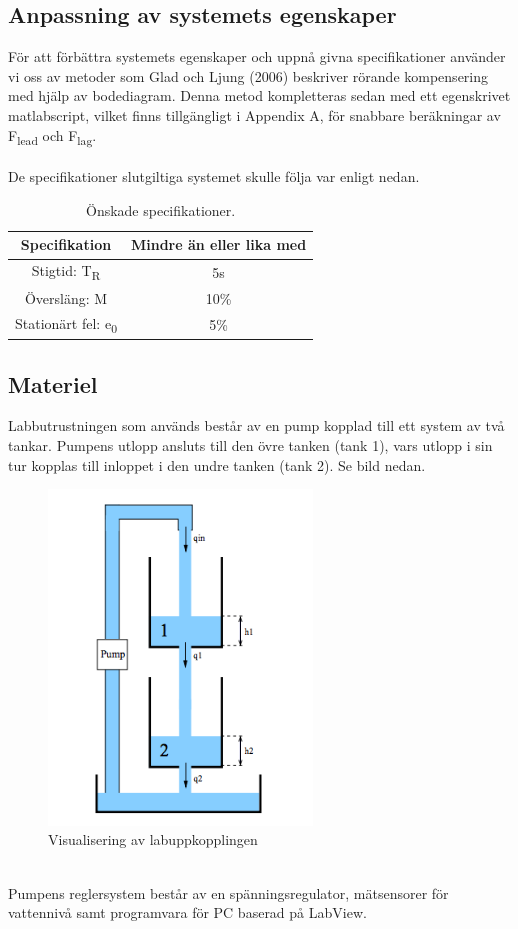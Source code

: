 \documentclass[a4wide]{article}
\begin{document}
\subsection{Anpassning av systemets egenskaper}
För att förbättra systemets egenskaper och uppnå givna specifikationer använder vi oss av metoder som Glad och Ljung (2006) beskriver rörande kompensering med hjälp av bodediagram. Denna metod kompletteras sedan med ett egenskrivet matlabscript, vilket finns tillgängligt i Appendix A, för snabbare beräkningar av F\textsubscript{lead} och F\textsubscript{lag}. 
\\
\\
De specifikationer slutgiltiga systemet skulle följa var enligt nedan. 

\begin{table}[ht] 
\centering 
\begin{tabular}{c c} 
Specifikation & Mindre än eller lika med \\ [0.5ex] %
\hline
Stigtid: T\textsubscript{R} & 5s \\
Översläng: M & 10\% \\
Stationärt fel: e\textsubscript{0} & 5\% \\

\end{tabular} 
\caption{Önskade specifikationer.}
\end{table}

\newpage




\subsection{Materiel}
Labbutrustningen som används består av en pump kopplad till ett system av två tankar. Pumpens utlopp ansluts till den övre tanken (tank 1), vars utlopp i sin tur kopplas till inloppet i den undre tanken (tank 2). Se bild nedan. 

\begin{figure}[ht!]
\centering
\includegraphics[width=70mm]{System.png}
\caption{Visualisering av labuppkopplingen}
\label{overflow}
\end{figure}
~\\
Pumpens reglersystem består av en spänningsregulator, mätsensorer för vattennivå samt programvara för PC baserad på LabView.
\newpage
\end{document}
